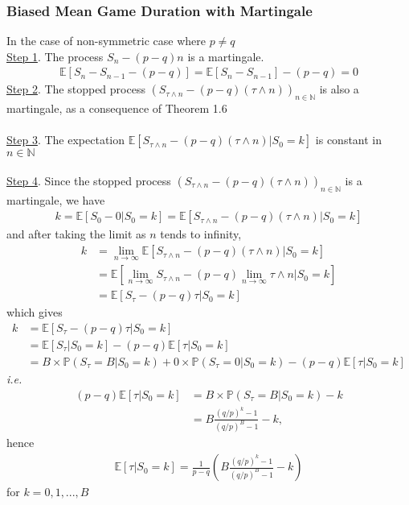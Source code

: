 \documentclass[12pt]{extarticle}
\newcommand{\<}{\langle}
\renewcommand{\>}{\rangle}
\theoremstyle{definition}
\begin{document}
\subsubsection{Biased Mean Game Duration with Martingale}
In the case of non-symmetric case where $p \neq q$\\
\underline{Step 1}. The process $S_n -(p-q)n$ is a martingale. \\
\begin{align*}
    \mathbb{E}[S_n -S_{n-1} -(p-q)] = \mathbb{E}[S_n - S_{n-1}] -(p-q) =0
\end{align*}
\underline{Step 2}. The stopped process $(S_{\tau \wedge n} -(p-q)(\tau \wedge n))_{n \in \mathbb{N}}$ is also a martingale, as a consequence of Theorem 1.6\\ \\
\underline{Step 3}. The expectation $\mathbb{E}[S_{\tau \wedge n} -(p-q)(\tau \wedge n) | S_0 =k]$ is constant in $n \in \mathbb{N}$\\ \\
\underline{Step 4}. Since the stopped process $(S_{\tau \wedge n} -(p-q)(\tau \wedge n))_{n \in \mathbb{N}}$ is a martingale, we have
\begin{align*}
    k = \mathbb{E}[S_0 -0 | S_0 =k] = \mathbb{E}[S_{\tau \wedge n} -(p-q)(\tau \wedge n)| S_0 =k]
\end{align*}
and after taking the limit as $n$ tends to infinity,
\begin{align*}
    k &= \lim_{n \to \infty} \mathbb{E}[S_{\tau \wedge n} -(p-q)(\tau \wedge n)| S_0 =k]\\
    &= \mathbb{E}[\lim_{n \to \infty}S_{\tau \wedge n} -(p-q)\lim_{n \to \infty}\tau \wedge n| S_0 =k]\\
    &= \mathbb{E}[S_\tau -(p-q)\tau| S_0 =k]
\end{align*}
which gives
\begin{align*}
    k &= \mathbb{E}[S_\tau -(p-q)\tau| S_0 =k]\\
    &= \mathbb{E}[S_\tau| S_0 =k]-(p-q)\mathbb{E}[\tau| S_0 =k]\\
    &= B \times \mathbb{P}(S_\tau =B| S_0 =k) + 0\times \mathbb{P}(S_\tau =0| S_0 =k) - (p-q)\mathbb{E}[\tau| S_0 =k]
\end{align*}
\textit{i.e.}
\begin{align*}
    (p-q)\mathbb{E}[\tau| S_0 =k] &= B \times \mathbb{P}(S_\tau =B| S_0 =k)-k\\
    &= B\frac{(q/p)^k-1}{(q/p)^B-1}-k,
\end{align*}
hence
\begin{align*}
    \mathbb{E}[\tau| S_0 =k]=\frac{1}{p-q}\left(B\frac{(q/p)^k-1}{(q/p)^B-1}-k \right)
\end{align*}
for $k=0,1,...,B$ \\
\end{document}
